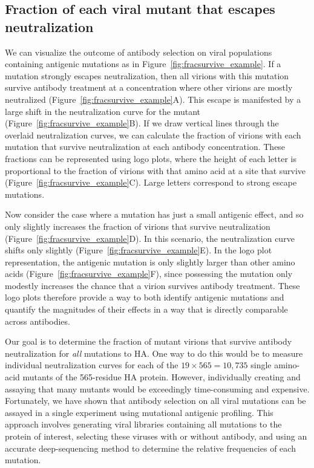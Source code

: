 \documentclass[11pt]{article}
\begin{document}
\subsection*{Fraction of each viral mutant that escapes neutralization}
We can visualize the outcome of antibody selection on viral populations containing antigenic mutations as in Figure~\ref{fig:fracsurvive_example}.
If a mutation strongly escapes neutralization, then all virions with this mutation survive antibody treatment at a concentration where other virions are mostly neutralized (Figure~\ref{fig:fracsurvive_example}A).
This escape is manifested by a large shift in the neutralization curve for the mutant (Figure~\ref{fig:fracsurvive_example}B).
If we draw vertical lines through the overlaid neutralization curves, we can calculate the fraction of virions with each mutation that survive neutralization at each antibody concentration.
These fractions can be represented using logo plots, where the height of each letter is proportional to the fraction of virions with that amino acid at a site that survive (Figure~\ref{fig:fracsurvive_example}C).
Large letters correspond to strong escape mutations. 


Now consider the case where a mutation has just a small antigenic effect, and so only slightly increases the fraction of virions that survive neutralization (Figure~\ref{fig:fracsurvive_example}D).
In this scenario, the neutralization curve shifts only slightly (Figure~\ref{fig:fracsurvive_example}E).
In the logo plot representation, the antigenic mutation is only slightly larger than other amino acids (Figure~\ref{fig:fracsurvive_example}F), since possessing the mutation only modestly increases the chance that a virion survives antibody treatment.
These logo plots therefore provide a way to both identify antigenic mutations and quantify the magnitudes of their effects in a way that is directly comparable across antibodies.

Our goal is to determine the fraction of mutant virions that survive antibody neutralization for \emph{all} mutations to HA.
One way to do this would be to measure individual neutralization curves for each of the $19\times565 = 10,735$ single amino-acid mutants of the 565-residue HA protein.
However, individually creating and assaying that many mutants would be exceedingly time-consuming and expensive.
Fortunately, we have shown that antibody selection on all viral mutations can be assayed in a single experiment using mutational antigenic profiling\cite{doud2017complete,dingens2017comprehensive}.
This approach involves generating viral libraries containing all mutations to the protein of interest, selecting these viruses with or without antibody, and using an accurate deep-sequencing method to determine the relative frequencies of each mutation.
\end{document}
